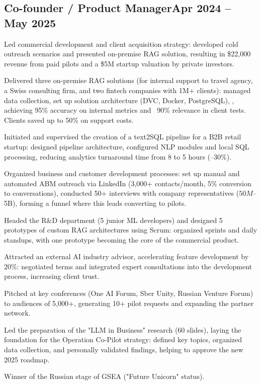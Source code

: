 \documentclass[a4paper,12pt]{article}
\begin{document}
\subsection{{Co-founder / Product Manager}\hfill Apr 2024 -- May 2025}
\begin{zitemize}
\item Led commercial development and client acquisition strategy: developed cold outreach scenarios and presented on-premise RAG solution, resulting in \$22,000 revenue from paid pilots and a \$5M startup valuation by private investors.
\item Delivered three on-premise RAG solutions (for internal support to travel agency, a Swiss consulting firm, and two fintech companies with 1M+ clients): managed data collection, set up solution architecture (DVC, Docker, PostgreSQL), , achieving 95\% accuracy on internal metrics and ~90\% relevance in client tests. Clients saved up to 50\% on support costs.
\item Initiated and supervised the creation of a text2SQL pipeline for a B2B retail startup: designed pipeline architecture, configured NLP modules and local SQL processing, reducing analytics turnaround time from 8 to 5 hours (–30\%).
\item Organized business and customer development processes: set up manual and automated ABM outreach via LinkedIn (3,000+ contacts/month, 5\% conversion to conversations), conducted 50+ interviews with company representatives ($50M–$5B), forming a funnel where this leads converting to pilots.
\item Headed the R&D department (5 junior ML developers) and designed 5 prototypes of custom RAG architectures using Scrum: organized sprints and daily standups, with one prototype becoming the core of the commercial product.
\item Attracted an external AI industry advisor, accelerating feature development by 20\%: negotiated terms and integrated expert consultations into the development process, increasing client trust.
\item Pitched at key conferences (One AI Forum, Sber Unity, Russian Venture Forum) to audiences of 5,000+, generating 10+ pilot requests and expanding the partner network.
\item Led the preparation of the "LLM in Business" research (60 slides), laying the foundation for the Operation Co-Pilot strategy: defined key topics, organized data collection, and personally validated findings, helping to approve the new 2025 roadmap.
\item Winner of the Russian stage of GSEA ("Future Unicorn" status).
\end{zitemize}
\end{document}

